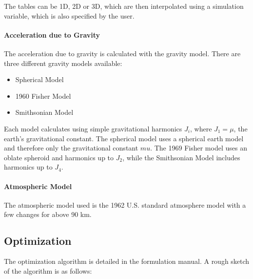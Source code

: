 The tables can be 1D, 2D or 3D, which are then interpolated using a simulation
variable, which is also specified by the user.

\paragraph{Acceleration due to Gravity}

The acceleration due to gravity is calculated with the gravity model. There
are three different gravity models available:
\begin{itemize}
  \item Spherical Model
  \item 1960 Fisher Model
  \item Smithsonian Model
\end{itemize}

Each model calculates using simple gravitational harmonics \(J_i\),
where \(J_1 = \mu\), the earth's gravitational constant. The spherical
model uses a spherical earth model and therefore only the gravitational
constant \(mu\). The 1969 Fisher model uses an oblate spheroid and
harmonics up to \(J_2\), while the Smithsonian Model includes harmonics
up to \(J_4\).

\paragraph{Atmospheric Model}

The atmospheric model used is the 1962 U.S. standard atmosphere model with a
few changes for above 90 km.

\subsection{Optimization}\label{optimization}

The optimization algorithm is detailed in the formulation manual. A rough
sketch of the algorithm is as follows:

